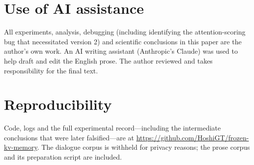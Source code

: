 \documentclass[11pt]{article}
\begin{document}
\section*{Use of AI assistance}

All experiments, analysis, debugging (including identifying the attention-scoring
bug that necessitated version 2) and scientific conclusions in this paper are the
author's own work. An AI writing assistant (Anthropic's Claude) was used to help
draft and edit the English prose. The author reviewed and takes responsibility
for the final text.

\section*{Reproducibility}

Code, logs and the full experimental record---including the intermediate
conclusions that were later falsified---are at
\url{https://github.com/HoshiGT/frozen-kv-memory}. The dialogue corpus is
withheld for privacy reasons; the prose corpus and its preparation script are
included.



\end{document}
